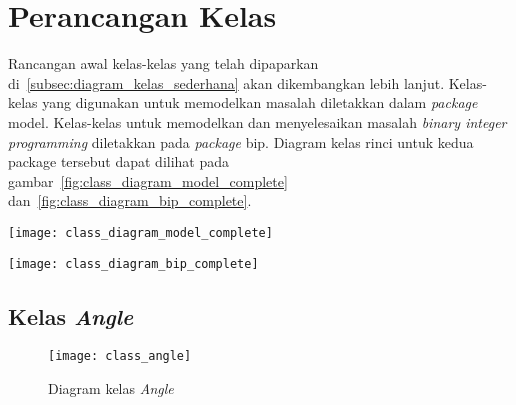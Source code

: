 \section{Perancangan Kelas}
Rancangan awal kelas-kelas yang telah dipaparkan di~\ref{subsec:diagram_kelas_sederhana} akan dikembangkan lebih lanjut. Kelas-kelas yang digunakan untuk memodelkan masalah diletakkan dalam \textit{package} model. Kelas-kelas untuk memodelkan dan menyelesaikan masalah \textit{binary integer programming} diletakkan pada \textit{package} bip. Diagram kelas rinci untuk kedua package tersebut dapat dilihat pada gambar~\ref{fig:class_diagram_model_complete} dan~\ref{fig:class_diagram_bip_complete}.

\begin{sidewaysfigure}
	\centering  
	\texttt{[image: class\_diagram\_model\_complete]}
	\caption[Diagram kelas rinci untuk \textit{package} model]{Diagram kelas rinci untuk \textit{package} model}
	\label{fig:class_diagram_model_complete}
\end{sidewaysfigure}

\begin{sidewaysfigure}
	\centering  
	\texttt{[image: class\_diagram\_bip\_complete]}
	\caption[Diagram kelas rinci untuk \textit{package} bip dan \textit{subpackage} balasadditive]{Diagram kelas rinci untuk \textit{package} bip dan \textit{subpackage} balasadditive}
	\label{fig:class_diagram_bip_complete}
\end{sidewaysfigure}

\subsection{Kelas \textit{Angle}}
\begin{figure}[H]
	\centering  
	\texttt{[image: class\_angle]}
	\caption[Diagram kelas \textit{Angle}]{Diagram kelas \textit{Angle}}
	\label{fig:class_angle}
\end{figure}
	
